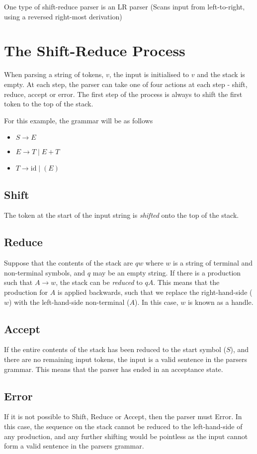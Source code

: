 One type of shift-reduce parser is an LR parser (Scans input from left-to-right, using a reversed right-most derivation)

\section*{The Shift-Reduce Process}

When parsing a string of tokens, $v$, the input is initialised to $v$ and the stack is empty. At each step, the parser
 can take one of four actions at each step - shift, reduce, accept or error. The first step of the process is always
 to shift the first token to the top of the stack.

For this example, the grammar will be as follows
\begin{itemize}
  \item $S \rightarrow E$
  \item $E \rightarrow T \mid E+T$
  \item $T \rightarrow \mathrm{id} \mid (E)$
\end{itemize}

\subsection*{Shift}

The token at the start of the input string is \textit{shifted} onto the top of the stack.

\subsection*{Reduce}

Suppose that the contents of the stack are $qw$ where $w$ is a string of terminal and non-terminal symbols, and $q$ may
 be an empty string. If there is a production such that $A \rightarrow w$, the stack can be \textit{reduced} to $qA$.
 This means that the production for $A$ is applied backwards, such that we replace the right-hand-side ($w$) with the
 left-hand-side non-terminal ($A$). In this case, $w$ is known as a handle.

\subsection*{Accept}

If the entire contents of the stack has been reduced to the start symbol ($S$), and there are no remaining input tokens,
 the input is a valid sentence in the parsers grammar. This means that the parser has ended in an acceptance state.

\subsection*{Error}

If it is not possible to Shift, Reduce or Accept, then the parser must Error. In this case, the sequence on the stack
 cannot be reduced to the left-hand-side of any production, and any further shifting would be pointless as the input
 cannot form a valid sentence in the parsers grammar.